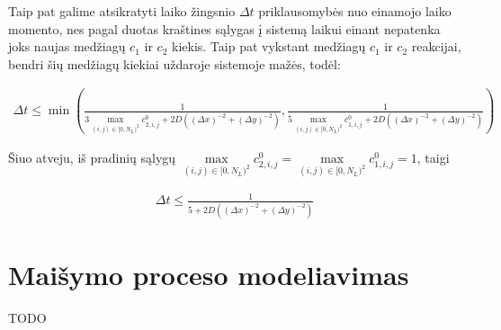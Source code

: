 \documentclass{article}
\begin{document}
Taip pat galime atsikratyti laiko žingsnio $\Delta t$ priklausomybės nuo einamojo laiko momento, nes
pagal duotas kraštines sąlygas į sistemą laikui einant nepatenka joks naujas medžiagų $c_1$ ir $c_2$ kiekis.
Taip pat vykstant medžiagų $c_1$ ir $c_2$ reakcijai, bendri šių medžiagų kiekiai uždaroje sistemoje mažės, todėl:

\begin{align*}
    \Delta t\leqslant\min\left(
        \frac{1}{3\max\limits_{(i,j)\in[0,N_L)^2}c^{0}_{2,i,j}+2D\left((\Delta x)^{-2}+(\Delta y)^{-2}\right)},
        \frac{1}{5\max\limits_{(i,j)\in[0,N_L)^2}c^{0}_{1,i,j}+2D\left((\Delta x)^{-2}+(\Delta y)^{-2}\right)}
    \right)
\end{align*}

Šiuo atveju, iš pradinių sąlygų $\max\limits_{(i,j)\in[0,N_L)^2}c^{0}_{2,i,j}=\max\limits_{(i,j)\in[0,N_L)^2}c^{0}_{1,i,j}=1$, taigi

\begin{align*}
    \Delta t\leqslant\frac{1}{5+2D\left((\Delta x)^{-2}+(\Delta y)^{-2}\right)}
\end{align*}

\newpage
\section{Maišymo proceso modeliavimas}

TODO
\end{document}
